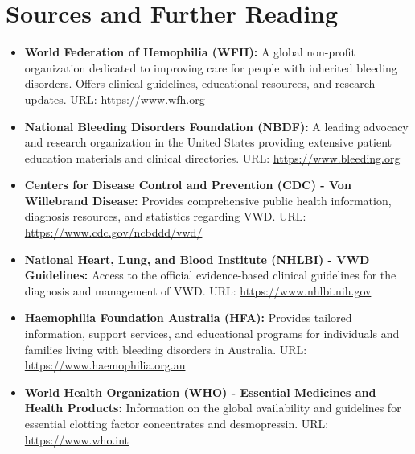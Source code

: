 \section*{Sources and Further Reading}
\begin{itemize}
    \item \textbf{World Federation of Hemophilia (WFH):} A global non-profit organization dedicated to improving care for people with inherited bleeding disorders. Offers clinical guidelines, educational resources, and research updates. URL: \url{https://www.wfh.org}
    \item \textbf{National Bleeding Disorders Foundation (NBDF):} A leading advocacy and research organization in the United States providing extensive patient education materials and clinical directories. URL: \url{https://www.bleeding.org}
    \item \textbf{Centers for Disease Control and Prevention (CDC) - Von Willebrand Disease:} Provides comprehensive public health information, diagnosis resources, and statistics regarding VWD. URL: \url{https://www.cdc.gov/ncbddd/vwd/}
    \item \textbf{National Heart, Lung, and Blood Institute (NHLBI) - VWD Guidelines:} Access to the official evidence-based clinical guidelines for the diagnosis and management of VWD. URL: \url{https://www.nhlbi.nih.gov}
    \item \textbf{Haemophilia Foundation Australia (HFA):} Provides tailored information, support services, and educational programs for individuals and families living with bleeding disorders in Australia. URL: \url{https://www.haemophilia.org.au}
    \item \textbf{World Health Organization (WHO) - Essential Medicines and Health Products:} Information on the global availability and guidelines for essential clotting factor concentrates and desmopressin. URL: \url{https://www.who.int}
\end{itemize}